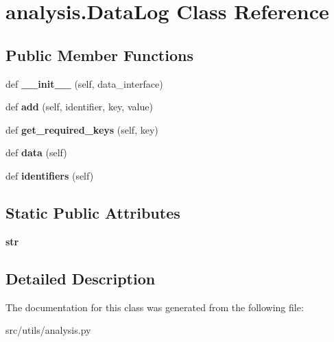 \hypertarget{classanalysis_1_1DataLog}{}\section{analysis.\+Data\+Log Class Reference}
\label{classanalysis_1_1DataLog}
\subsection*{Public Member Functions}
\begin{DoxyCompactItemize}
\item 
def {\bfseries \+\_\+\+\_\+init\+\_\+\+\_\+} (self, data\+\_\+interface)\hypertarget{classanalysis_1_1DataLog_ab0bb3f72c3261c4a0e1d96242526cbae}{}\label{classanalysis_1_1DataLog_ab0bb3f72c3261c4a0e1d96242526cbae}

\item 
def {\bfseries add} (self, identifier, key, value)\hypertarget{classanalysis_1_1DataLog_a3f99cf1502204b3c1c7a1a41c60ccec4}{}\label{classanalysis_1_1DataLog_a3f99cf1502204b3c1c7a1a41c60ccec4}

\item 
def {\bfseries get\+\_\+required\+\_\+keys} (self, key)\hypertarget{classanalysis_1_1DataLog_af5e78092a36a9d7065afa77ddc0a34b7}{}\label{classanalysis_1_1DataLog_af5e78092a36a9d7065afa77ddc0a34b7}

\item 
def {\bfseries data} (self)\hypertarget{classanalysis_1_1DataLog_a459c8669a4867d4a2dcab963890f42bf}{}\label{classanalysis_1_1DataLog_a459c8669a4867d4a2dcab963890f42bf}

\item 
def {\bfseries identifiers} (self)\hypertarget{classanalysis_1_1DataLog_aed72cd702096ef3c8b6d202233e418c2}{}\label{classanalysis_1_1DataLog_aed72cd702096ef3c8b6d202233e418c2}

\end{DoxyCompactItemize}
\subsection*{Static Public Attributes}
\begin{DoxyCompactItemize}
\item 
{\bfseries str}\hypertarget{classanalysis_1_1DataLog_a92c66f41513976e488b85bb347bb423b}{}\label{classanalysis_1_1DataLog_a92c66f41513976e488b85bb347bb423b}

\end{DoxyCompactItemize}


\subsection{Detailed Description}
\begin{DoxyVerb}\end{DoxyVerb}
 

The documentation for this class was generated from the following file\+:\begin{DoxyCompactItemize}
\item 
src/utils/analysis.\+py\end{DoxyCompactItemize}
